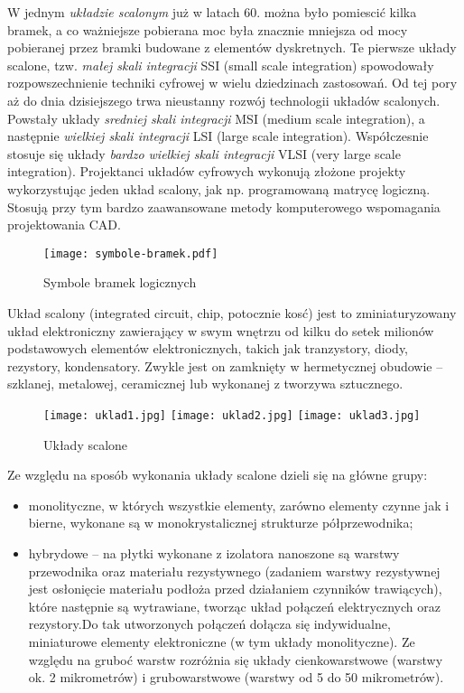 \documentclass[a4paper,11pt]{article}
\begin{document}
 W jednym \emph{układzie scalonym} już w latach 60. można było pomiescić kilka bramek, a co ważniejsze pobierana moc była znacznie mniejsza od mocy pobieranej przez bramki budowane z elementów dyskretnych. Te pierwsze układy scalone, tzw. \emph{małej skali integracji} SSI (small scale integration) spowodowały rozpowszechnienie techniki cyfrowej w wielu dziedzinach zastosowań. Od tej pory aż do dnia dzisiejszego trwa nieustanny rozwój technologii układów scalonych. Powstały układy \emph{sredniej skali integracji} MSI (medium scale integration), a następnie \emph{wielkiej skali integracji} LSI (large scale integration). Współczesnie stosuje się układy \emph{bardzo wielkiej skali integracji} VLSI (very large scale integration). Projektanci układów cyfrowych wykonują złożone projekty wykorzystując jeden układ scalony, jak np. programowaną matrycę logiczną. Stosują przy tym bardzo zaawansowane metody komputerowego wspomagania projektowania CAD. 
\begin{figure}[!htb]
\centerline{\texttt{[image: symbole-bramek.pdf]}}
\caption{Symbole bramek logicznych}
\label{fig:symboleBramek}
\end{figure}

Układ scalony (integrated circuit, chip, potocznie kosć) jest to zminiaturyzowany układ elektroniczny zawierający w swym wnętrzu od kilku do setek milionów podstawowych elementów elektronicznych, takich jak tranzystory, diody, rezystory, kondensatory. Zwykle jest on zamknięty w hermetycznej obudowie -- szklanej, metalowej, ceramicznej lub wykonanej z tworzywa sztucznego.
\begin{figure}[!htb]
\centering
\texttt{[image: uklad1.jpg]}
\quad
\texttt{[image: uklad2.jpg]}
\quad
\texttt{[image: uklad3.jpg]}
\caption{Układy scalone}
\label{fig:uklady}
\end{figure}

Ze względu na sposób wykonania układy scalone dzieli się na główne grupy:\begin{itemize}
\item monolityczne, w których wszystkie elementy, zarówno elementy czynne jak i bierne, wykonane są w monokrystalicznej strukturze półprzewodnika;
\item hybrydowe -- na płytki wykonane z izolatora nanoszone są warstwy przewodnika oraz materiału rezystywnego (zadaniem warstwy rezystywnej jest osłonięcie materiału podłoża przed działaniem czynników trawiących), które następnie są wytrawiane, tworząc układ połączeń elektrycznych oraz rezystory.Do tak utworzonych połączeń dołącza się indywidualne, miniaturowe elementy elektroniczne (w tym układy monolityczne). Ze względu na gruboć warstw rozróżnia się układy cienkowarstwowe (warstwy ok. 2 mikrometrów) i grubowarstwowe (warstwy od 5 do 50 mikrometrów).\end{itemize}
\end{document}
